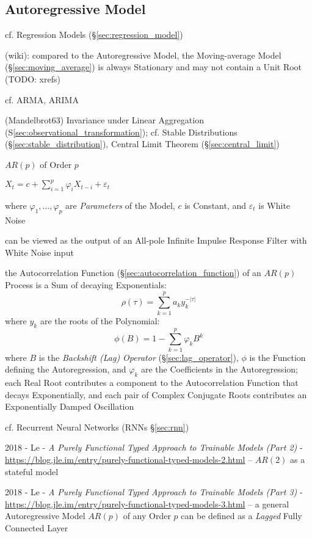 \subsection{Autoregressive Model}\label{sec:autoregressive_model}

cf. Regression Models (\S\ref{sec:regression_model})

(wiki): compared to the Autoregressive Model, the Moving-average Model
(\S\ref{sec:moving_average}) is always Stationary and may not contain a Unit
Root (TODO: xrefs)

cf. ARMA, ARIMA

(Mandelbrot63) Invariance under Linear Aggregation
(S\ref{sec:observational_transformation}); cf. Stable Distributions
(\S\ref{sec:stable_distribution}), Central Limit Theorem
(\S\ref{sec:central_limit})

$AR(p)$ of Order $p$

$X_t = c + \sum_{i=1}^p \varphi_i X_{t-i} + \varepsilon_t$

where $\varphi_1, \ldots, \varphi_p$ are \emph{Parameters} of the Model, $c$ is
Constant, and $\varepsilon_t$ is White Noise

can be viewed as the output of an All-pole Infinite Impulse Response Filter with
White Noise input

the Autocorrelation Function (\S\ref{sec:autocorrelation_function}) of an
$AR(p)$ Process is a Sum of decaying Exponentials:
\[
  \rho(\tau) = \sum_{k=1}^p a_k y_k^{-|\tau|}
\]
where $y_k$ are the roots of the Polynomial:
\[
  \phi(B) = 1 - \sum_{k=1}^p \varphi_k B^k
\]
where $B$ is the \emph{Backshift (Lag) Operator} (\S\ref{sec:lag_operator}),
$\phi$ is the Function defining the Autoregression, and $\varphi_k$ are the
Coefficients in the Autoregression;
each Real Root contributes a component to the Autocorrelation Function that
decays Exponentially, and each pair of Complex Conjugate Roots contributes an
Exponentially Damped Oscillation

\fist cf. Recurrent Neural Networks (RNNs \S\ref{sec:rnn})

2018 - Le -
\emph{A Purely Functional Typed Approach to Trainable Models (Part 2)} -
\url{https://blog.jle.im/entry/purely-functional-typed-models-2.html}
-- $AR(2)$ as a stateful model

2018 - Le -
\emph{A Purely Functional Typed Approach to Trainable Models (Part 3)} -
\url{https://blog.jle.im/entry/purely-functional-typed-models-3.html}
-- a general Autoregressive Model $AR(p)$ of any Order $p$ can be defined as a
\emph{Lagged} Fully Connected Layer




